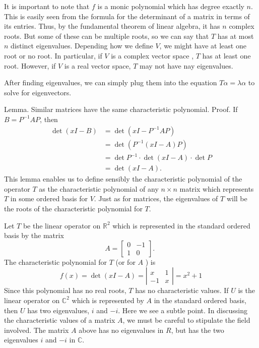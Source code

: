 \documentclass[main.tex]{subfiles}
\begin{document}
It is important to note that $f$ is a monic polynomial which has degree exactly $n$. This is easily seen from the formula for the determinant of a matrix in terms of its entries. Thus, by the fundamental theorem of linear algebra, it has $n$ complex roots. But some of these can be multiple roots, so we can say that $T$ has at most $n$ distinct eigenvalues. Depending how we define $V$, we might have at least one root or no root. In particular, if $V$ is a complex vector space , $T$ has at least one root. However, if $V$ is a real vector space, $T$ may not have nay eigenvalues. 

After finding eigenvalues, we can simply plug them into the equation $T\alpha = \lambda \alpha$ to solve for eigenvectors. 

Lemma. Similar matrices have the same characteristic polynomial. Proof. If $B=P^{-1} A P$, then
$$
\begin{aligned}
\operatorname{det}(x I-B) & =\operatorname{det}\left(x I-P^{-1} A P\right) \\
& =\operatorname{det}\left(P^{-1}(x I-A) P\right) \\
& =\operatorname{det} P^{-1} \cdot \operatorname{det}(x I-A) \cdot \operatorname{det} P \\
& =\operatorname{det}(x I-A) .
\end{aligned}
$$
This lemma enables us to define sensibly the characteristic polynomial of the operator $T$ as the characteristic polynomial of any $n \times n$ matrix which represents $T$ in some ordered basis for $V$. Just as for matrices, the eigenvalues of $T$ will be the roots of the characteristic polynomial for $T$. 

\begin{example}
    
Let $T$ be the linear operator on $\mathbb{R}^2$ which is represented in the standard ordered basis by the matrix
$$
A=\left[\begin{array}{rr}
0 & -1 \\
1 & 0
\end{array}\right] \text {. }
$$
The characteristic polynomial for $T$ (or for $A$ ) is
$$
f(x) = \operatorname{det}(x I-A)=\left|\begin{array}{rr}
x & 1 \\
-1 & x
\end{array}\right|=x^2+1
$$
Since this polynomial has no real roots, $T$ has no characteristic values. If $U$ is the linear operator on $\mathbb{C}^2$ which is represented by $A$ in the standard ordered basis, then $U$ has two eigenvalues, $i$ and $-i$. Here we see a subtle point. In discussing the characteristic values of a matrix $A$, we must be careful to stipulate the field involved. The matrix $A$ above has no eigenvalues in $R$, but has the two eigenvalues $i$ and $-i$ in $\mathbb{C}$.
\end{example} 
\end{document}
